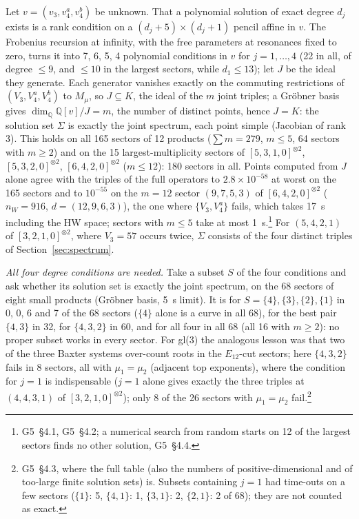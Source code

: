 \documentclass[11pt]{article}
\newcommand{\rg}[2]{\textsf{G#1}~\S#2}
\begin{document}
Let $v=(v_3,v_4^a,v_4^b)$ be unknown.
That a polynomial solution of exact degree $d_j$ exists is a rank condition on a $(d_j+5)\times(d_j+1)$ pencil affine in $v$.
The Frobenius recursion at infinity, with the free parameters at resonances fixed to zero, turns it into 7, 6, 5, 4 polynomial conditions in $v$ for $j=1,\dots,4$ (22 in all, of degree $\le9$, and $\le10$ in the largest sectors, while $d_1\le13$); let $J$ be the ideal they generate.
Each generator vanishes exactly on the commuting restrictions of $(V_3,V_4^a,V_4^b)$ to $M_\mu$, so $J\subseteq K$, the ideal of the $m$ joint triples; a Gr\"obner basis gives $\dim_{\mathbb{Q}}\mathbb{Q}[v]/J=m$, the number of distinct points, hence $J=K$: the solution set $\Sigma$ is exactly the joint spectrum, each point simple (Jacobian of rank 3).
This holds on all 165 sectors of 12 products ($\sum m=279$, $m\le5$, 64 sectors with $m\ge2$) and on the 15 largest-multiplicity sectors of $[5,3,1,0]^{\otimes2}$, $[5,3,2,0]^{\otimes2}$, $[6,4,2,0]^{\otimes2}$ ($m\le12$): 180 sectors in all.
Points computed from $J$ alone agree with the triples of the full operators to $2.8\times10^{-58}$ at worst on the 165 sectors and to $10^{-55}$ on the $m=12$ sector $(9,7,5,3)$ of $[6,4,2,0]^{\otimes2}$ ($n_W=916$, $d=(12,9,6,3)$), the one where $\{V_3,V_4^a\}$ fails, which takes 17~s including the HW space; sectors with $m\le5$ take at most 1~s.\footnote{\rg{5}{4.1}, \rg{5}{4.2}; a numerical search from random starts on 12 of the largest sectors finds no other solution, \rg{5}{4.4}.}
For $(5,4,2,1)$ of $[3,2,1,0]^{\otimes2}$, where $V_3=57$ occurs twice, $\Sigma$ consists of the four distinct triples of Section~\ref{sec:spectrum}.

\emph{All four degree conditions are needed.}
Take a subset $S$ of the four conditions and ask whether its solution set is exactly the joint spectrum, on the 68 sectors of eight small products (Gr\"obner basis, 5~s limit).
It is for $S=\{4\},\{3\},\{2\},\{1\}$ in 0, 0, 6 and 7 of the 68 sectors ($\{4\}$ alone is a curve in all 68), for the best pair $\{4,3\}$ in 32, for $\{4,3,2\}$ in 60, and for all four in all 68 (all 16 with $m\ge2$): no proper subset works in every sector.
For gl(3) the analogous lesson was that two of the three Baxter systems over-count roots in the $E_{12}$-cut sectors; here $\{4,3,2\}$ fails in 8 sectors, all with $\mu_1=\mu_2$ (adjacent top exponents), where the condition for $j=1$ is indispensable ($j=1$ alone gives exactly the three triples at $(4,4,3,1)$ of $[3,2,1,0]^{\otimes2}$); only 8 of the 26 sectors with $\mu_1=\mu_2$ fail.\footnote{\rg{5}{4.3}, where the full table (also the numbers of positive-dimensional and of too-large finite solution sets) is. Subsets containing $j=1$ had time-outs on a few sectors ($\{1\}$: 5, $\{4,1\}$: 1, $\{3,1\}$: 2, $\{2,1\}$: 2 of 68); they are not counted as exact.}
\end{document}
